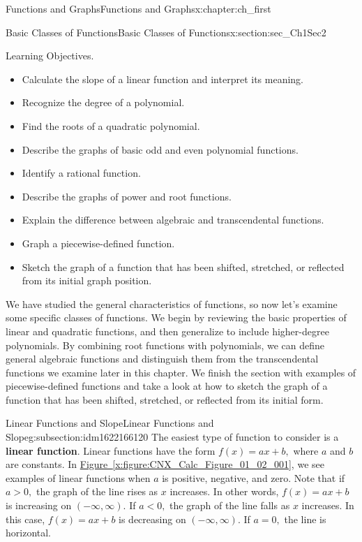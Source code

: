 \documentclass[oneside,10pt,]{book}
\newcommand{\xreffont}{\relax}
\newcommand{\terminology}[1]{\textbf{#1}}
\numberwithin{equation}{section}
\newcommand{\lt}{<}
\newcommand{\gt}{>}
\begin{document}
\begin{chapterptx}{Functions and Graphs}{}{Functions and Graphs}{}{}{x:chapter:ch_first}
\begin{sectionptx}{Basic Classes of Functions}{}{Basic Classes of Functions}{}{}{x:section:sec_Ch1Sec2}
\begin{introduction}{Learning Objectives.}
%
\begin{itemize}[label=\textbullet]
\item{}Calculate the slope of a linear function and interpret its meaning.%
\item{}Recognize the degree of a polynomial.%
\item{}Find the roots of a quadratic polynomial.%
\item{}Describe the graphs of basic odd and even polynomial functions.%
\item{}Identify a rational function.%
\item{}Describe the graphs of power and root functions.%
\item{}Explain the difference between algebraic and transcendental functions.%
\item{}Graph a piecewise-defined function.%
\item{}Sketch the graph of a function that has been shifted, stretched, or reflected from its initial graph position.%
\end{itemize}
We have studied the general characteristics of functions, so now let's examine some specific classes of functions. We begin by reviewing the basic properties of linear and quadratic functions, and then generalize to include higher-degree polynomials. By combining root functions with polynomials, we can define general algebraic functions and distinguish them from the transcendental functions we examine later in this chapter. We finish the section with examples of piecewise-defined functions and take a look at how to sketch the graph of a function that has been shifted, stretched, or reflected from its initial form.%
\end{introduction}%
%
%
\typeout{************************************************}
\typeout{************************************************}
%
\begin{subsectionptx}{Linear Functions and Slope}{}{Linear Functions and Slope}{}{}{g:subsection:idm1622166120}
The easiest type of function to consider is a \terminology{linear function}. Linear functions have the form \(f(x)=ax+b,\) where \(a\) and \(b\) are constants. In \hyperref[x:figure:CNX_Calc_Figure_01_02_001]{Figure~{\xreffont\ref{x:figure:CNX_Calc_Figure_01_02_001}}}, we see examples of linear functions when \(a\) is positive, negative, and zero. Note that if \(a\gt  0 ,\) the graph of the line rises as \(x\) increases. In other words, \(f(x)=ax+b\) is increasing on \((-\infty,\infty).\) If \(a\lt  0 ,\) the graph of the line falls as \(x\) increases. In this case, \(f(x)=ax+b\) is decreasing on \((-\infty,\infty).\) If \(a= 0 ,\) the line is horizontal.%

\end{subsectionptx}
\end{sectionptx}
\end{chapterptx}
\end{document}
